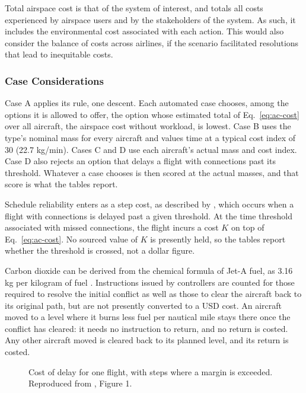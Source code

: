 Total airspace cost is that of the system of interest, and totals all costs experienced by airspace users and by the stakeholders of the system. As such, it includes the environmental cost associated with each action. This would also consider the balance of costs across airlines, if the scenario facilitated resolutions that lead to inequitable costs. 


\subsubsection{Case Considerations}


Case A applies its rule, one descent. Each automated case chooses, among the options it is allowed to offer, the option whose estimated total of Eq.~\ref{eq:ac-cost} over all aircraft, the airspace cost without workload, is lowest. Case B uses the type's nominal mass for every aircraft and values time at a typical cost index of 30 (22.7 kg/min). Cases C and D use each aircraft's actual mass and cost index. Case D also rejects an option that delays a flight with connections past its threshold. Whatever a case chooses is then scored at the actual masses, and that score is what the tables report.

Schedule reliability enters as a step cost, as described by \cite{pilon2019udppMargins}, which occurs when a flight with connections is delayed past a given threshold. At the time threshold associated with missed connections, the flight incurs a cost $K$ on top of Eq.~\ref{eq:ac-cost}. No sourced value of $K$ is presently held, so the tables report whether the threshold is crossed, not a dollar figure.

Carbon dioxide can be derived from the chemical formula of Jet-A fuel, as 3.16 kg per kilogram of fuel \cite{icao2024icecMethodology}. Instructions issued by controllers are counted for those required to resolve the initial conflict as well as those to clear the aircraft back to its original path, but are not presently converted to a USD cost. An aircraft moved to a level where it burns less fuel per nautical mile stays there once the conflict has cleared: it needs no instruction to return, and no return is costed. Any other aircraft moved is cleared back to its planned level, and its return is costed.

\begin{figure}[htbp]
\centering
{}
\caption{Cost of delay for one flight, with steps where a margin is exceeded. Reproduced from \cite{pilon2019udppMargins}, Figure 1.}
\label{fig:cost-of-delay}
\end{figure}


